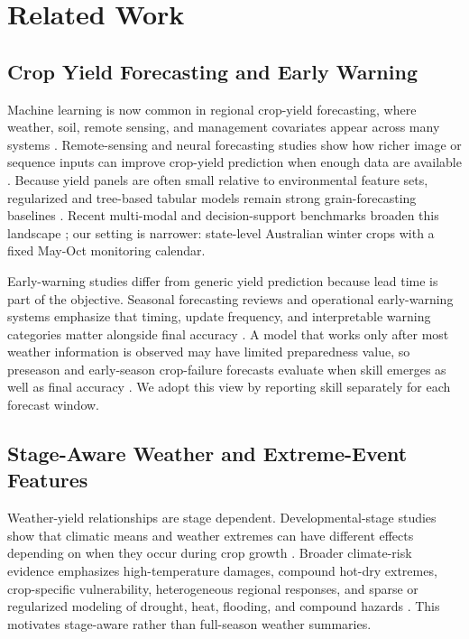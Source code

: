 \documentclass[wcp]{jmlr}
\begin{document}
\section{Related Work}

\subsection{Crop Yield Forecasting and Early Warning}

Machine learning is now common in regional crop-yield forecasting, where weather, soil, remote sensing, and management covariates appear across many systems \citep{vanKlompenburg2020systematicReview,paudel2021largeScaleYield}. Remote-sensing and neural forecasting studies show how richer image or sequence inputs can improve crop-yield prediction when enough data are available \citep{you2017deepGaussian,khaki2019dnn,khaki2020cnnRnn}. Because yield panels are often small relative to environmental feature sets, regularized and tree-based tabular models remain strong grain-forecasting baselines \citep{meroni2021smallData}. Recent multi-modal and decision-support benchmarks broaden this landscape \citep{lin2024cropnet,declercq2024indiaRice}; our setting is narrower: state-level Australian winter crops with a fixed May-Oct monitoring calendar.

Early-warning studies differ from generic yield prediction because lead time is part of the objective. Seasonal forecasting reviews and operational early-warning systems emphasize that timing, update frequency, and interpretable warning categories matter alongside final accuracy \citep{basso2019seasonalForecast,rembold2019asap}. A model that works only after most weather information is observed may have limited preparedness value, so preseason and early-season crop-failure forecasts evaluate when skill emerges as well as final accuracy \citep{anderson2024preseasonWarning}. We adopt this view by reporting skill separately for each forecast window.

\subsection{Stage-Aware Weather and Extreme-Event Features}

Weather-yield relationships are stage dependent. Developmental-stage studies show that climatic means and weather extremes can have different effects depending on when they occur during crop growth \citep{schierhorn2021developmentalStages}. Broader climate-risk evidence emphasizes high-temperature damages, compound hot-dry extremes, crop-specific vulnerability, heterogeneous regional responses, and sparse or regularized modeling of drought, heat, flooding, and compound hazards \citep{schauberger2017temperature,heino2023hotDryExtremes,sjulgard2023swedenAnomalies,heilemann2024lassoExtremes,kabtih2025hotPluvial}. This motivates stage-aware rather than full-season weather summaries.
\end{document}
